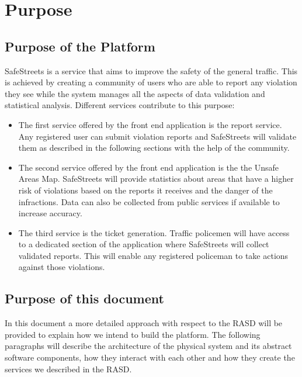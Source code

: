 \section{Purpose}

\subsection{Purpose of the Platform}
SafeStreets is a service that aims to improve the safety of the general traffic.
This is achieved by creating a community of users who are able to report any violation they see while the system manages
all the aspects of data validation and statistical analysis.
Different services contribute to this purpose:
\begin{itemize}
  \item The first service offered by the front end application is the report service. Any registered user can submit violation reports and SafeStreets will validate them as described in the following sections with the help of the community.
  \item The second service offered by the front end application is the the Unsafe Areas Map. SafeStreets will provide statistics about areas that have a higher risk of violations based on the reports it receives and the danger of the infractions. Data can also be collected from public services if available to increase accuracy.
  \item The third service is the ticket generation. Traffic policemen will have access to a dedicated section of the application where SafeStreets will collect validated reports. This will enable any registered policeman to take actions against those violations.
\end{itemize}

\subsection{Purpose of this document}
In this document a more detailed approach with respect to the RASD will be provided to explain how we intend to build the platform. The following paragraphs
will describe the architecture of the physical system and its abstract software components, how they interact with each other and how they create the services
we described in the RASD.